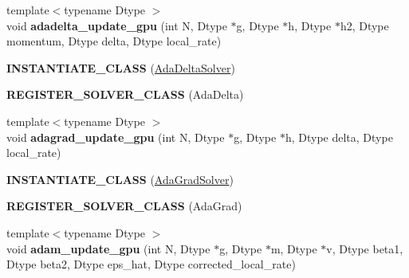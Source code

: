 \begin{DoxyCompactItemize}
\item 
{\footnotesize template$<$typename Dtype $>$ }\\void {\bfseries adadelta\+\_\+update\+\_\+gpu} (int N, Dtype $\ast$g, Dtype $\ast$h, Dtype $\ast$h2, Dtype momentum, Dtype delta, Dtype local\+\_\+rate)\hypertarget{namespacecaffe_a6371e76ca471695989f83769105dbce0}{}\label{namespacecaffe_a6371e76ca471695989f83769105dbce0}

\item 
{\bfseries I\+N\+S\+T\+A\+N\+T\+I\+A\+T\+E\+\_\+\+C\+L\+A\+SS} (\hyperlink{classcaffe_1_1AdaDeltaSolver}{Ada\+Delta\+Solver})\hypertarget{namespacecaffe_a113bdc980cbb9f2af47aacd96e65745b}{}\label{namespacecaffe_a113bdc980cbb9f2af47aacd96e65745b}

\item 
{\bfseries R\+E\+G\+I\+S\+T\+E\+R\+\_\+\+S\+O\+L\+V\+E\+R\+\_\+\+C\+L\+A\+SS} (Ada\+Delta)\hypertarget{namespacecaffe_abb127972b9f22d3db0c8aa8ca91292f9}{}\label{namespacecaffe_abb127972b9f22d3db0c8aa8ca91292f9}

\item 
{\footnotesize template$<$typename Dtype $>$ }\\void {\bfseries adagrad\+\_\+update\+\_\+gpu} (int N, Dtype $\ast$g, Dtype $\ast$h, Dtype delta, Dtype local\+\_\+rate)\hypertarget{namespacecaffe_a5f5a95a53781fee3860a7b2649775c77}{}\label{namespacecaffe_a5f5a95a53781fee3860a7b2649775c77}

\item 
{\bfseries I\+N\+S\+T\+A\+N\+T\+I\+A\+T\+E\+\_\+\+C\+L\+A\+SS} (\hyperlink{classcaffe_1_1AdaGradSolver}{Ada\+Grad\+Solver})\hypertarget{namespacecaffe_a831bef9b557689042deec03d8bfeaa4d}{}\label{namespacecaffe_a831bef9b557689042deec03d8bfeaa4d}

\item 
{\bfseries R\+E\+G\+I\+S\+T\+E\+R\+\_\+\+S\+O\+L\+V\+E\+R\+\_\+\+C\+L\+A\+SS} (Ada\+Grad)\hypertarget{namespacecaffe_aa7e8efd116fe1ad53ac4687a17e58368}{}\label{namespacecaffe_aa7e8efd116fe1ad53ac4687a17e58368}

\item 
{\footnotesize template$<$typename Dtype $>$ }\\void {\bfseries adam\+\_\+update\+\_\+gpu} (int N, Dtype $\ast$g, Dtype $\ast$m, Dtype $\ast$v, Dtype beta1, Dtype beta2, Dtype eps\+\_\+hat, Dtype corrected\+\_\+local\+\_\+rate)\hypertarget{namespacecaffe_a483e041e0c80d67e254f52003bf2ef27}{}\label{namespacecaffe_a483e041e0c80d67e254f52003bf2ef27}


\end{DoxyCompactItemize}
